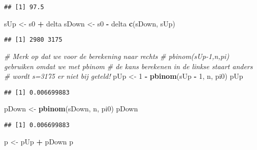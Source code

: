 \documentclass[12pt,dutch,coursenotes]{book}
\newenvironment{Shaded}{\begin{snugshade}}{\end{snugshade}}
\newcommand{\KeywordTok}[1]{\textcolor[rgb]{0.13,0.29,0.53}{\textbf{#1}}}
\newcommand{\DecValTok}[1]{\textcolor[rgb]{0.00,0.00,0.81}{#1}}
\newcommand{\StringTok}[1]{\textcolor[rgb]{0.31,0.60,0.02}{#1}}
\newcommand{\CommentTok}[1]{\textcolor[rgb]{0.56,0.35,0.01}{\textit{#1}}}
\newcommand{\OperatorTok}[1]{\textcolor[rgb]{0.81,0.36,0.00}{\textbf{#1}}}
\newcommand{\NormalTok}[1]{#1}
\theoremstyle{definition}
\theoremstyle{definition}
\theoremstyle{definition}
\theoremstyle{remark}
\begin{document}
\begin{verbatim}
## [1] 97.5
\end{verbatim}

\begin{Shaded}
\begin{Highlighting}[]
\NormalTok{sUp <-}\StringTok{ }\NormalTok{s0 }\OperatorTok{+}\StringTok{ }\NormalTok{delta}
\NormalTok{sDown <-}\StringTok{ }\NormalTok{s0 }\OperatorTok{-}\StringTok{ }\NormalTok{delta}
\KeywordTok{c}\NormalTok{(sDown, sUp)}
\end{Highlighting}
\end{Shaded}

\begin{verbatim}
## [1] 2980 3175
\end{verbatim}

\begin{Shaded}
\begin{Highlighting}[]
\CommentTok{# Merk op dat we voor de berekening naar rechts}
\CommentTok{# pbinom(sUp-1,n,pi) gebruiken omdat we met pbinom}
\CommentTok{# de kans berekenen in de linkse staart anders}
\CommentTok{# wordt s=3175 er niet bij geteld!}
\NormalTok{pUp <-}\StringTok{ }\DecValTok{1} \OperatorTok{-}\StringTok{ }\KeywordTok{pbinom}\NormalTok{(sUp }\OperatorTok{-}\StringTok{ }\DecValTok{1}\NormalTok{, n, pi0)}
\NormalTok{pUp}
\end{Highlighting}
\end{Shaded}

\begin{verbatim}
## [1] 0.006699883
\end{verbatim}

\begin{Shaded}
\begin{Highlighting}[]
\NormalTok{pDown <-}\StringTok{ }\KeywordTok{pbinom}\NormalTok{(sDown, n, pi0)}
\NormalTok{pDown}
\end{Highlighting}
\end{Shaded}

\begin{verbatim}
## [1] 0.006699883
\end{verbatim}

\begin{Shaded}
\begin{Highlighting}[]
\NormalTok{p <-}\StringTok{ }\NormalTok{pUp }\OperatorTok{+}\StringTok{ }\NormalTok{pDown}
\NormalTok{p}
\end{Highlighting}
\end{Shaded}
\end{document}
